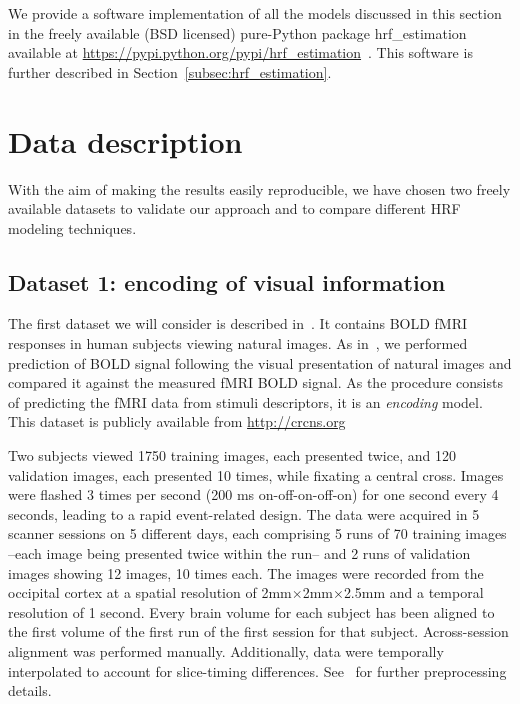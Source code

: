 We provide a software implementation of all the models discussed in this section
in the freely available (BSD licensed) pure-Python package \textsf{hrf\_estimation}
available at {\href{https://pypi.python.org/pypi/hrf\_estimation}{https://pypi.python.org/pypi/hrf\_estimation}}~. This software is further described in Section~\ref{subsec:hrf_estimation}.

\section{Data description}

With the aim of making the results easily reproducible, we have
chosen two freely available datasets to validate our approach and to compare
different HRF modeling techniques.


\subsection{Dataset 1: encoding of visual information}\label{subsec:encoding_dataset}

The first dataset we will consider is 
described in~\citep{Kay2008,naselaris2009bayesian,kay2011data}. It contains 
BOLD fMRI responses in human subjects viewing natural images.
As in~\citep{Kay2008}, we performed
prediction of BOLD signal following the visual presentation of natural images
and compared it against the measured fMRI BOLD signal.
As the procedure consists of predicting the fMRI data
from stimuli descriptors, it is an {\it encoding} model.
This dataset is publicly available from \url{http://crcns.org}

Two subjects viewed 1750 training images, each presented twice,
and 120 validation images, each presented 10 times, while fixating a
central cross. Images were flashed 3 times per second (200 ms
on-off-on-off-on) for one second every 4 seconds, leading to a rapid
event-related design. The data were acquired in 5 scanner sessions on 5 different days,
each comprising 5 runs of 70 training images --each image  being presented twice
within the run-- and 2 runs of validation images showing 12 images,
10 times each. The images were recorded from the occipital cortex at a spatial resolution of 2mm$\times$2mm$\times$2.5mm
and a temporal resolution of 1 second. Every brain volume for each subject has been aligned to the first volume of the first run of the 
first session for that subject. Across-session alignment was performed manually. Additionally, 
data were temporally interpolated to account for slice-timing differences. See~\citep{Kay2008} for further preprocessing details. 



